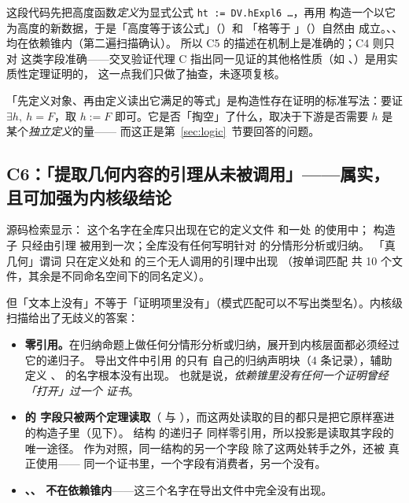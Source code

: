 
这段代码先把高度函数\emph{定义}为显式公式 \texttt{ht := DV.hExpl6 …}，再用  构造一个以它为高度的新数据，于是「高度等于该公式」（）和
「格等于 」（）自然由  成立。、、 均在依赖锥内（第二遍扫描确认）。
所以 C5 的描述在机制上是准确的；C4 则只对  这类字段准确——交叉验证代理 C 指出同一见证的其他格性质（如 、）是用实质性定理证明的，
这一点我们只做了抽查，未逐项复核。

「先定义对象、再由定义读出它满足的等式」是构造性存在证明的标准写法：要证 $\exists h,\ h = F$，取 $h := F$ 即可。它是否「掏空」了什么，取决于下游是否需要 $h$ 是某个\emph{独立定义}的量——
而这正是第~\ref{sec:logic}~节要回答的问题。

\subsection{C6：「提取几何内容的引理从未被调用」——属实，且可加强为内核级结论}
\label{sec:fact-unused}

源码检索显示： 这个名字在全库只出现在它的定义文件  和一处  的使用中；
构造子  只经由引理  被用到一次；全库没有任何写明针对  的分情形分析或归纳。
「真几何」谓词  只在定义处和  的三个无人调用的引理中出现
（按单词匹配  共 10 个文件，其余是不同命名空间下的同名定义）。

但「文本上没有」不等于「证明项里没有」（模式匹配可以不写出类型名）。内核级扫描给出了无歧义的答案：

\begin{verdictbox}
\begin{itemize}
\item \textbf{ 零引用。}在归纳命题上做任何分情形分析或归纳，展开到内核层面都必须经过它的递归子。
导出文件中引用  的只有  自己的归纳声明块（4 条记录），辅助定义 、 的名字根本没有出现。
也就是说，\emph{依赖锥里没有任何一个证明曾经「打开」过一个  证书}。
\item \textbf{ 的  字段只被两个定理读取}（ 与 ），而这两处读取的目的都只是把它原样塞进  的构造子里（见下）。
结构  的递归子  同样零引用，所以投影是读取其字段的唯一途径。
作为对照，同一结构的另一个字段  除了这两处转手之外，还被  真正使用——
同一个证书里，一个字段有消费者，另一个没有。
\item \textbf{、、 不在依赖锥内}——这三个名字在导出文件中完全没有出现。
\end{itemize}
\end{verdictbox}

